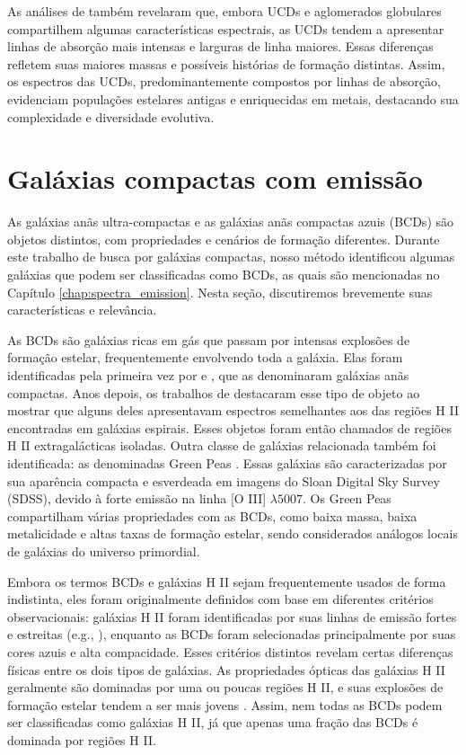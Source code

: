 As análises de \cite{Mieske_2006} também revelaram que, embora UCDs e aglomerados globulares compartilhem algumas características espectrais, as UCDs tendem a apresentar linhas de absorção mais intensas e larguras de linha maiores. Essas diferenças refletem suas maiores massas e possíveis histórias de formação distintas. Assim, os espectros das UCDs, predominantemente compostos por linhas de absorção, evidenciam populações estelares antigas e enriquecidas em metais, destacando sua complexidade e diversidade evolutiva.

\section{Galáxias compactas com emissão}\label{sec:galaxias_compactas_emissao}
As galáxias anãs ultra-compactas e as galáxias anãs compactas azuis (BCDs) são objetos distintos, com propriedades e cenários de formação diferentes. Durante este trabalho de busca por galáxias compactas, nosso método identificou algumas galáxias que podem ser classificadas como BCDs, as quais são mencionadas no Capítulo \ref{chap:spectra_emission}. Nesta seção, discutiremos brevemente suas características e relevância.

As BCDs são galáxias ricas em gás que passam por intensas explosões de formação estelar, frequentemente envolvendo toda a galáxia. Elas foram identificadas pela primeira vez por \cite{Hardie_1956} e \cite{Zwicky_1961}, que as denominaram galáxias anãs compactas. Anos depois, os trabalhos de \cite{Sargent_1970} destacaram esse tipo de objeto ao mostrar que alguns deles apresentavam espectros semelhantes aos das regiões H II encontradas em galáxias espirais. Esses objetos foram então chamados de regiões H II extragalácticas isoladas. Outra classe de galáxias relacionada também foi identificada: as denominadas Green Peas \citep{Cardamone_2009}. Essas galáxias são caracterizadas por sua aparência compacta e esverdeada em imagens do Sloan Digital Sky Survey (SDSS), devido à forte emissão na linha [O III] $\lambda5007$. Os Green Peas compartilham várias propriedades com as BCDs, como baixa massa, baixa metalicidade e altas taxas de formação estelar, sendo considerados análogos locais de galáxias do universo primordial.

Embora os termos BCDs e galáxias H II sejam frequentemente usados de forma indistinta, eles foram originalmente definidos com base em diferentes critérios observacionais: galáxias H II foram identificadas por suas linhas de emissão fortes e estreitas (e.g., \citealt{Terlevich_1991}), enquanto as BCDs foram selecionadas principalmente por suas cores azuis e alta compacidade. Esses critérios distintos revelam certas diferenças físicas entre os dois tipos de galáxias. As propriedades ópticas das galáxias H II geralmente são dominadas por uma ou poucas regiões H II, e suas explosões de formação estelar tendem a ser mais jovens \citep{Telles_1995}. Assim, nem todas as BCDs podem ser classificadas como galáxias H II, já que apenas uma fração das BCDs é dominada por regiões H II.

